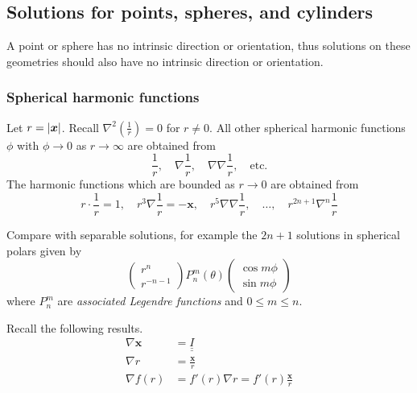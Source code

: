 \documentclass{jknotes}
\newcommand{\dunder}[1]{\underline{\underline{#1}}}
\newcommand{\x}{\bm{x}}
\newcommand{\inv}[1]{\frac{1}{#1}}
\begin{document}
\subsection{Solutions for points, spheres, and cylinders}
A point or sphere has no intrinsic direction or orientation, thus solutions on
these geometries should also have no intrinsic direction or orientation.

\subsubsection{Spherical harmonic functions}
Let $r = \abs{\x}$. Recall $\nabla^2 (\frac{1}{r}) = 0$ for $r \ne 0$. All
other spherical harmonic functions $\phi$ with $\phi \to 0$ as $r \to \infty$
are obtained from 
\begin{equation}
	\frac{1}{r}, \hspace{1em}\nabla \frac{1}{r},\hspace{1em} \nabla \nabla
	\frac{1}{r}, \hspace{1em}\text{etc.}
\end{equation}
The harmonic functions which are bounded as $r \to 0$ are
obtained from 
\begin{equation}
	r \cdot \inv{r} = 1,\hspace{1em} r^3 \nabla \inv{r} = -\x,\hspace{1em} r^5 \nabla
\nabla \inv{r},\hspace{1em} \dots,\hspace{1em} r^{2n+1} \nabla^n \inv{r}
\end{equation}

Compare with separable solutions, for example the $2n+1$ solutions in
spherical polars given by
\begin{equation}
\begin{pmatrix} r^n \\ r^{-n-1} \end{pmatrix} P_n^m(\theta) \begin{pmatrix}
\cos m \phi \\ \sin m\phi\end{pmatrix}
\end{equation}
where $P_n^m$ are \emph{associated Legendre functions} and $0 \le m \le n$.


Recall the following results.
\begin{equation}
	\begin{aligned}
		\nabla \x &= \dunder{I} \\
		\nabla r &= \frac{\x}{r} \\
		\nabla f(r) &= f'(r) \nabla r = f'(r) \frac{\x}{r}
	\end{aligned}
\end{equation}
\end{document}
